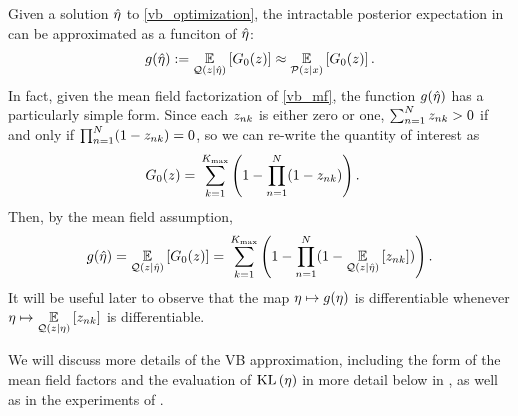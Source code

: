 \begin{ex}
%
Given a solution $\hat\eta$ to \eqref{vb_optimization}, the intractable posterior
expectation in  can be approximated as
a funciton of $\hat\eta$:
%
\begin{align*}
%
\g(\etaopt) :={}
    \expect{\q(\z\vert\etaopt)}{\nclusters_0(\z)} \approx
    \expect{\p(\z\vert\x)}{\nclusters_0(\z)}.
%
\end{align*}
%
In fact, given the mean field factorization of \eqref{vb_mf}, the function
$g(\hat\eta)$ has a particularly simple form.  Since each $z_{nk}$ is either
zero or one, $\sum_{n=1}^N z_{nk} > 0$ if and only if $\prod_{n=1}^N (1 -
z_{nk}) = 0$, so we can re-write the quantity of interest as
%
\begin{align*}
%
\nclusters_0(\z) ={}&
    \sumk \left(1 -  \prod_{\n=1}^\N (1 - \z_{\n\k})\right).
%
\end{align*}
%
Then, by the mean field assumption,
%
\begin{align*}
%
g(\etaopt) ={}
\expect{\q(\z \vert \etaopt)}{\nclusters_0(\z)} ={}
    \sumk \left(1 -  \prod_{\n=1}^\N
        (1 - \expect{\q(\z \vert \etaopt)}{\z_{\n\k}})\right).
%
\end{align*}
%
It will be useful later to observe that the map $\eta \mapsto g(\eta)$ is
differentiable whenever $\eta \mapsto \underset{\mathcal{Q}(z \vert \eta)}{\mathbb{E}}\left[z_{nk}\right]$
is differentiable.
%
\end{ex}

We will discuss more details of the VB approximation, including the form of the
mean field factors and the evaluation of $\mathrm{KL}\left(\eta\right)$ in more detail below in
, as well as in the experiments of
.
